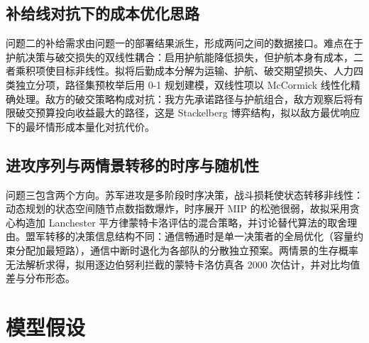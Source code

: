 \documentclass[12pt,a4paper]{ctexart}
\begin{document}
\subsection{补给线对抗下的成本优化思路}

问题二的补给需求由问题一的部署结果派生，形成两问之间的数据接口。难点在于护航决策与破交损失的双线性耦合：启用护航能降低损失，但护航本身有成本，二者乘积项使目标非线性。拟将后勤成本分解为运输、护航、破交期望损失、人力四类独立分项，路径集预枚举后用 0-1 规划建模，双线性项以 McCormick 线性化精确处理\cite{ref7}。敌方的破交策略构成对抗：我方先承诺路径与护航组合，敌方观察后将有限破交预算投向收益最大的路径，这是 Stackelberg 博弈结构\cite{ref10}，拟以敌方最优响应下的最坏情形成本量化对抗代价。

\subsection{进攻序列与两情景转移的时序与随机性}

问题三包含两个方向。苏军进攻是多阶段时序决策，战斗损耗使状态转移非线性：动态规划的状态空间随节点数指数爆炸，时序展开 MIP 的松弛很弱，故拟采用贪心构造加 Lanchester 平方律蒙特卡洛评估的混合策略\cite{ref8,ref9}，并讨论替代算法的取舍理由。盟军转移的决策信息结构不同：通信畅通时是单一决策者的全局优化（容量约束分配加最短路），通信中断时退化为各部队的分散独立预案。两情景的生存概率无法解析求得，拟用逐边伯努利拦截的蒙特卡洛仿真各 2000 次估计\cite{ref11}，并对比均值差与分布形态。

\section{模型假设}
\end{document}
